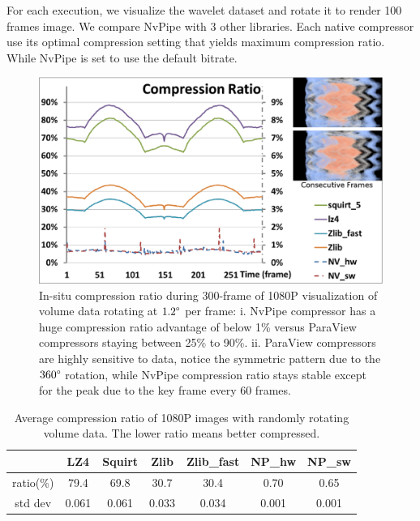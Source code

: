 \documentclass{vgtc}                          %
\begin{document}
For each execution, we visualize the wavelet dataset and rotate it to render 100 frames image. We compare NvPipe with 3 other libraries. Each native compressor use its optimal compression setting that yields maximum compression ratio. While NvPipe is set to use the default bitrate.

\begin{figure}[h]
  \label{figure:compressRatio}
  \centering
  \includegraphics[width=\columnwidth]{compressRatio.eps}
  \caption{In-situ compression ratio during 300-frame of 1080P visualization of volume data rotating at \(1.2\degree\) per frame: i. NvPipe compressor has a huge compression ratio advantage of below 1\% versus ParaView compressors staying between 25\% to 90\%. ii. ParaView compressors are highly sensitive to data, notice the symmetric pattern due to the \(360\degree\) rotation, while NvPipe compression ratio stays stable except for the peak due to the key frame every 60 frames. }
\end{figure}


\begin{table}[b]
  \caption{Average compression ratio of 1080P images with randomly rotating volume data. The lower ratio means better compressed. }
  \label{table:compression_ratio}
  \scriptsize
  \begin{center}
    \begin{tabular}{ccccccc}
      & LZ4 & Squirt & Zlib & Zlib\_fast & NP\_hw & NP\_sw \\
    \hline
      ratio(\%) & 79.4 & 69.8 & 30.7 & 30.4 & 0.70 & 0.65 \\
      std dev & 0.061 & 0.061 & 0.033 & 0.034 & 0.001 & 0.001
    \end{tabular}
  \end{center}
\end{table}
\end{document}
